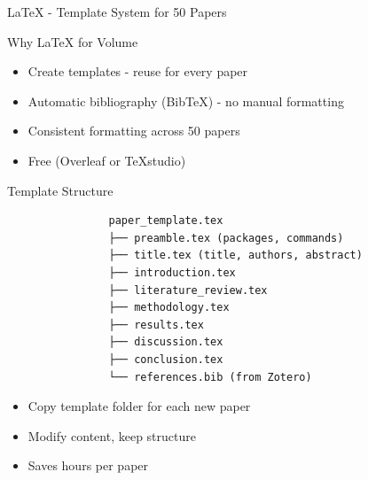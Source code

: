 \documentclass[11pt]{beamer}
\begin{document}
	\begin{frame}{LaTeX - Template System for 50 Papers}
		\scriptsize
		\begin{block}{Why LaTeX for Volume}
			\begin{itemize}
				\item Create templates - reuse for every paper
				\item Automatic bibliography (BibTeX) - no manual formatting
				\item Consistent formatting across 50 papers
				\item Free (Overleaf or TeXstudio)
			\end{itemize}
		\end{block}
		\begin{block}{Template Structure}
			\begin{verbatim}
				paper_template.tex
				├── preamble.tex (packages, commands)
				├── title.tex (title, authors, abstract)
				├── introduction.tex
				├── literature_review.tex
				├── methodology.tex
				├── results.tex
				├── discussion.tex
				├── conclusion.tex
				└── references.bib (from Zotero)
			\end{verbatim}
			\begin{itemize}
				\item Copy template folder for each new paper
				\item Modify content, keep structure
				\item Saves hours per paper
			\end{itemize}
		\end{block}
	\end{frame}
	
\end{document}
